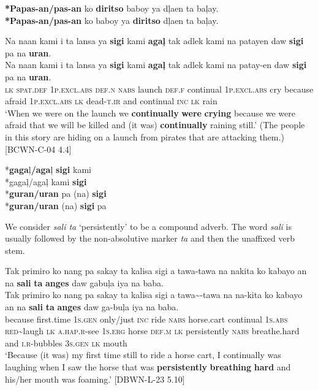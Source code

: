 \textbf{*Papas-an/pas-an} ko \textbf{diritso} baboy ya dļaen ta baļay. \\
\textbf{*Papas-an/pas-an} ko baboy ya \textbf{diritso} dļaen ta baļay.

\newpage

\ex
Na  naan  kami  i  ta  lansa  ya  \textbf{sigi}  kami \textbf{agaļ}  tak  adlek  kami  na  patayen  daw  \textbf{sigi}  pa  na  \textbf{uran}. \\\smallskip
 \gll Na  naan  kami  i  ta  lansa  ya  \textbf{sigi}  kami \textbf{agaļ}  tak  adlek  kami  na  patay-en  daw  \textbf{sigi}  pa  na  \textbf{uran}. \\
\textsc{lk}  \textsc{spat.def} 1\textsc{p.excl.abs}  \textsc{def.n}  \textsc{nabs}  launch  \textsc{def.f}  continual  1\textsc{p.excl.abs}
cry  because  afraid  1\textsc{p.excl.abs}  \textsc{lk}  dead-\textsc{t.ir}  and  continual  \textsc{inc}  \textsc{lk}  rain \\
\glt ‘When we were on the launch we \textbf{continually} \textbf{were} \textbf{crying} because we were afraid that we will be killed and (it was) \textbf{continually} raining still.’ (The people in this story are hiding on a launch from pirates that are attacking them.) [BCWN-C-04 4.4] \\\smallskip

*\textbf{gaga}ļ\textbf{/aga}ļ \textbf{sigi} kami \\
*gagaļ/agaļ kami \textbf{sigi} \\
*\textbf{guran/uran} pa (na) \textbf{sigi} \\
*\textbf{guran/uran} (na) \textbf{sigi} pa
\z
\z

We consider \textit{sali ta} ‘persistently’ to be a compound adverb. The word \textit{sali} is usually followed by the non-absolutive marker \textit{ta} and then the unaffixed verb stem.

\ea
Tak  primiro  ko  nang  pa  sakay  ta  kalisa  sigi a  tawa-tawa  na  nakita  ko  kabayo  an  na  \textbf{sali} \textbf{ta}  \textbf{anges}  daw  gabuļa  iya  na  baba. \\\smallskip
 \gll Tak  primiro  ko  nang  pa  sakay  ta  kalisa  sigi a  tawa\sim{}-tawa  na  na-kita  ko  kabayo  an  na  \textbf{sali} \textbf{ta}  \textbf{anges}  daw  ga-buļa  iya  na  baba. \\
because  first.time  1\textsc{s.gen}  only/just  \textsc{inc}  ride  \textsc{nabs}  horse.cart  continual
1\textsc{s.abs}  \textsc{red}\sim{}laugh  \textsc{lk}  \textsc{a.hap.r}-see  1\textsc{s.erg}  horse  \textsc{def.m}  \textsc{lk}  persistently
\textsc{nabs}  breathe.hard  and  \textsc{i.r}-bubbles  3\textsc{s.gen}  \textsc{lk}  mouth \\
\glt ‘Because (it was) my first time still to ride a horse cart, I continually was laughing when I saw the horse that was \textbf{persistently} \textbf{breathing} \textbf{hard} and his/her mouth was foaming.’ [DBWN-L-23 5.10] \\\smallskip

